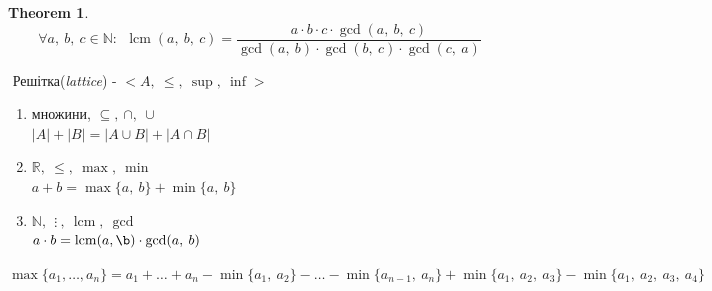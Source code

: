 \documentclass[a4paper,12pt, centered]{bookest}
\newtheorem{theorem}{Theorem}[section]
\DeclareMathOperator{\lcm}{lcm}
\begin{document}
\begin{theorem}
$$\forall a,\>b,\>c\in\mathbb{N}:\>\>\lcm(a,\>b,\>c)=\frac{a\cdot b\cdot c\cdot \gcd(a,\>b,\>c)}{\gcd(a,\>b)\cdot\gcd(b,\>c)\cdot\gcd(c,\>a)}$$	
\end{theorem}$ $
Решітка(\emph{lattice}) - $<A,\>\leq,\>\sup,\>\inf>$
\begin{example}
	\begin{enumerate}
		\item множини, $\subseteq,\>\cap,\>\cup$\\
		$|A|+|B|=|A\cup B|+|A\cap B|$
		\item $\mathbb{R},\>\leq,\>\max,\>\min$\\
		$a+b=\max\{a,\>b\}+\min\{a,\>b\}$
		\item $\mathbb{N},\>\>\vdots\>,\>\lcm,\>\gcd$\\
		$a\cdot b=\lcm(a,\b)\cdot\gcd(a,\>b)$
	\end{enumerate}
	$\max \{a_1,\dots,a_n\}=a_1+\dots+a_n-\min\{a_1,\>a_2\}-\dots-\min\{a_{n-1},\>a_n\}+\min\{a_1,\>a_2,\>a_3\}-\min\{a_1,\>a_2,\>a_3,\>a_4\}$	
\end{example}	
\end{document}
